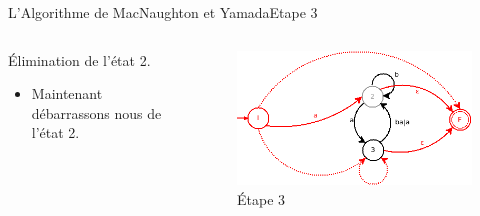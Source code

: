 \documentclass{beamer}
\begin{document}
\begin{frame}{L'Algorithme de MacNaughton et Yamada}{Etape 3}
     \begin{columns}[T]
     \begin{column}{.48\textwidth}
         {\fontsize{8}{9}\selectfont Élimination de l'état 2.}       
         \begin{itemize}
         
             \item {\fontsize{7}{8}\selectfont Maintenant débarrassons nous de l'état 2.}
             
         \end{itemize}
     \end{column}
     
     \begin{column}{.48\textwidth}
     \begin{figure}
     \includegraphics[scale=0.37]{Diagramme4_1.png}
     \centering
     \caption{Étape 3}     
     \end{figure}
     \end{column}
        
     \end{columns}
\end{frame}
\end{document}
